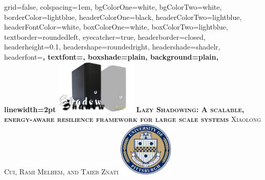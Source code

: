 \documentclass[landscape,final,a0paper,fontscale=0.285]{baposter}
\begin{document}
\begin{poster}%
  {
  grid=false,
  colspacing=1em,
  bgColorOne=white,
  bgColorTwo=white,
  borderColor=lightblue,
  headerColorOne=black,
  headerColorTwo=lightblue,
  headerFontColor=white,
  boxColorOne=white,
  boxColorTwo=lightblue,
  textborder=roundedleft,
  eyecatcher=true,
  headerborder=closed,
  headerheight=0.1\textheight,
  headershape=roundedright,
  headershade=shadelr,
  headerfont=\Large\bf\textsc, %
  textfont={\setlength{\parindent}{1.5em}},
  boxshade=plain,
  background=plain,
  linewidth=2pt
  }
  {\includegraphics[height=7em]{images/shadow.jpg}} 
  {\bf\textsc{Lazy Shadowing: A scalable, energy-aware resilience
  framework for large scale systems}\vspace{0.5em}}
  {\textsc{Xiaolong Cui, Rami Melhem, and Taieb Znati}}
  {%
    \includegraphics[height=7.0em]{images/logo.jpg}
  }

    \newcommand{\colouredcircle}{%
      \tikz{\useasboundingbox (-0.2em,-0.32em) rectangle(0.2em,0.32em); \draw[draw=black,fill=lightblue,line width=0.03em] (0,0) circle(0.18em);}}


\end{poster}
\end{document}

